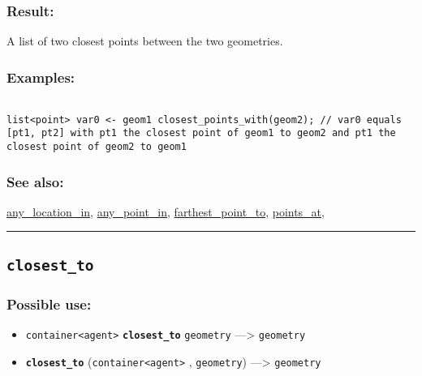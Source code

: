 \documentclass[]{book}
\providecommand{\tightlist}{%
  \setlength{\itemsep}{0pt}\setlength{\parskip}{0pt}}
\theoremstyle{definition}
\theoremstyle{definition}
\theoremstyle{definition}
\theoremstyle{remark}
\begin{document}
\subsubsection{Result:}\label{result-86}

A list of two closest points between the two geometries.

\subsubsection{Examples:}\label{examples-67}

\begin{verbatim}
 
list<point> var0 <- geom1 closest_points_with(geom2); // var0 equals [pt1, pt2] with pt1 the closest point of geom1 to geom2 and pt1 the closest point of geom2 to geom1
\end{verbatim}

\subsubsection{See also:}\label{see-also-53}

\href{operators-a-to-a.html\#any_location_in}{any\_location\_in},
\href{operators-a-to-a.html\#any_point_in}{any\_point\_in},
\href{operators-d-to-h.html\#farthest_point_to}{farthest\_point\_to},
\href{operators-n-to-r.html\#points_at}{points\_at},

\begin{center}\rule{0.5\linewidth}{\linethickness}\end{center}

\subsection{\texorpdfstring{\texttt{closest\_to}}{closest\_to}}\label{closest_to}

\subsubsection{Possible use:}\label{possible-use-89}

\begin{itemize}
\tightlist
\item
  \texttt{container\textless{}agent\textgreater{}}
  \textbf{\texttt{closest\_to}} \texttt{geometry} ---\textgreater{}
  \texttt{geometry}
\item
  \textbf{\texttt{closest\_to}}
  (\texttt{container\textless{}agent\textgreater{}} , \texttt{geometry})
  ---\textgreater{} \texttt{geometry}
\end{itemize}
\end{document}
